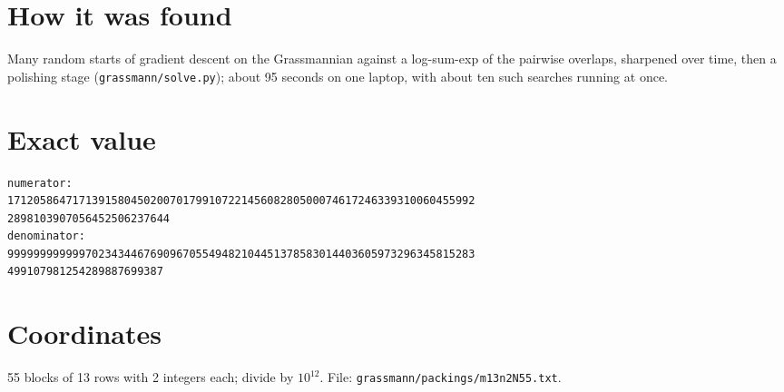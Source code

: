 \documentclass[11pt,a4paper]{article}
\begin{document}
\section{How it was found}
Many random starts of gradient descent on the Grassmannian against a log-sum-exp of the pairwise overlaps, sharpened over time, then a polishing stage (\texttt{grassmann/solve.py}); about 95 seconds on one laptop, with about ten such searches running at once.


\appendix
\section{Exact value}
{\small
\begin{verbatim}
numerator:
171205864717139158045020070179910722145608280500074617246339310060455992
2898103907056452506237644
denominator:
999999999999702343446769096705549482104451378583014403605973296345815283
499107981254289887699387
\end{verbatim}}

\section{Coordinates}
55 blocks of 13 rows with 2 integers each; divide by $10^{12}$. File: \texttt{grassmann/packings/m13n2N55.txt}.
{\tiny
\begin{multicols}{4}
\end{multicols}}
\end{document}
